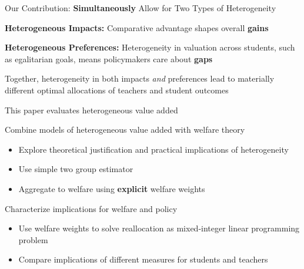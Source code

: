 \documentclass[t,aspectratio=169,11pt]{beamer}
\begin{document}
\begin{frame}{Our Contribution: \textbf{Simultaneously} Allow for Two Types of Heterogeneity}
    \begin{wideitemize}
         \vfill
                
             
            
                \item<1-> \textbf{Heterogeneous Impacts:} Comparative advantage shapes overall \textbf{gains}
                \item<2-> \textbf{Heterogeneous Preferences:} Heterogeneity in valuation across students, such as egalitarian goals, means policymakers care about \textbf{gaps}
                \vspace{+12pt}
                \item <3->Together, heterogeneity in both impacts \textit{and} preferences lead to materially different optimal allocations of teachers and student outcomes
                
             

        
       
    \end{wideitemize}
    \vfill
    
\end{frame}



\begin{frame}{This paper evaluates heterogeneous value added}

    \vfill
    \begin{wideitemize}
        \item Combine models of heterogeneous value added with welfare theory
            \begin{itemize}
                \item Explore theoretical justification and practical implications of heterogeneity
                
                \item Use simple two group estimator
                
                \item Aggregate to welfare using {\textbf{explicit}} welfare weights
            \end{itemize}
            
      
        
        \item<2-> Characterize implications for welfare and policy
            \begin{itemize}
                \item Use welfare weights to solve reallocation as  mixed-integer linear programming problem
                
                \item Compare implications of different measures for students and teachers
            \end{itemize}
    \end{wideitemize}
    \vfill

\end{frame}
\end{document}
